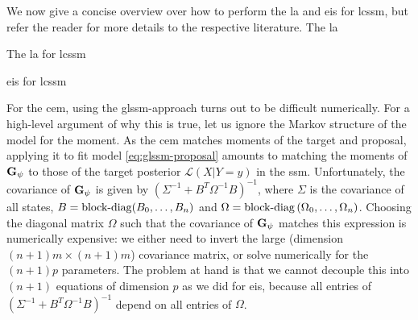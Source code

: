 We now give a concise overview over how to perform the \gls{la} and \gls{eis} for \gls{lcssm}, but refer the reader for more details to the respective literature.
The \gls{la} 

\begin{algorithm}
    \caption{The \gls{la} for \gls{lcssm}}
    \label{alg:la}
\end{algorithm}

\begin{algorithm}
    \caption{\gls{eis} for \gls{lcssm}}
    \label{alg:eis}
\end{algorithm}


For the \gls{cem}, using the \gls{glssm}-approach turns out to be difficult numerically. For a high-level argument of why this is true, let us ignore the Markov structure of the model for the moment. As the \gls{cem} matches moments of the target and proposal, applying it to fit model \eqref{eq:glssm-proposal} amounts to matching the moments of $\mathbf G_{\psi}$ to those of the target posterior $\mathcal L (X | Y = y)$ in the \gls{ssm}. Unfortunately, the covariance of $\mathbf G_{\psi}$ is given by $ \left( \Sigma^{-1} + B^{T}\Omega^{-1} B \right)^{-1}$, where $\Sigma$ is the covariance of all states, $B = \operatorname{block-diag} (B_{0}, \dots, B_{n})$ and $\Omega = \operatorname{block-diag} \left( \Omega_{0}, \dots, \Omega_{n} \right)$. Choosing the diagonal matrix $\Omega$ such that the covariance of $\mathbf G_{\psi}$ matches this expression is numerically expensive: we either need to invert the large (dimension $(n + 1)m \times (n + 1)m$) covariance matrix, or solve numerically for the $(n + 1)p$ parameters. The problem at hand is that we cannot decouple this into $(n + 1)$ equations of dimension $p$ as we did for \gls{eis}, because all entries of $(\Sigma^{-1} + B^{T}\Omega^{-1} B)^{-1}$ depend on all entries of $\Omega$. 

